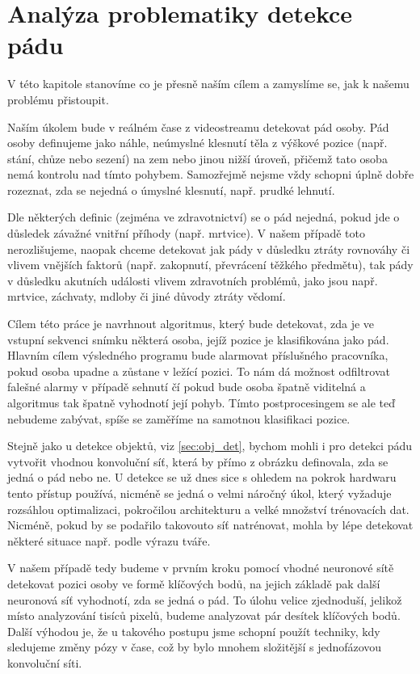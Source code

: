 \chapter{Analýza problematiky detekce pádu}
\label{sec:Goal}

V této kapitole stanovíme co je přesně naším cílem a zamyslíme se, jak k našemu
problému přistoupit.

Naším úkolem bude v reálném čase z videostreamu detekovat pád osoby. Pád osoby
definujeme jako náhle, neúmyslné klesnutí těla z výškové pozice (např. stání,
chůze nebo sezení) na zem nebo jinou nižší úroveň, přičemž tato osoba nemá
kontrolu nad tímto pohybem. Samozřejmě nejsme vždy schopni úplně dobře
rozeznat, zda se nejedná o úmyslné klesnutí, např. prudké lehnutí.

Dle některých definic (zejména ve zdravotnictví) se o pád nejedná, pokud jde o
důsledek závažné vnitřní příhody (např. mrtvice). V našem případě toto
nerozlišujeme, naopak chceme detekovat jak pády v důsledku ztráty rovnováhy či
vlivem vnějších faktorů (např. zakopnutí, převrácení těžkého předmětu), tak
pády v důsledku akutních události vlivem zdravotních problémů, jako jsou např.
mrtvice, záchvaty, mdloby či jiné důvody ztráty vědomí.

Cílem této práce je navrhnout algoritmus, který bude detekovat, zda je ve
vstupní sekvenci snímku některá osoba, jejíž pozice je klasifikována jako pád.
Hlavním cílem výsledného programu bude alarmovat příslušného pracovníka, pokud
osoba upadne a zůstane v ležící pozici. To nám dá možnost odfiltrovat falešné
alarmy v případě sehnutí čí pokud bude osoba špatně viditelná a algoritmus tak
špatně vyhodnotí její pohyb. Tímto postprocesingem se ale teď nebudeme zabývat,
spíše se zaměříme na samotnou klasifikaci pozice.

Stejně jako u detekce objektů, viz \ref{sec:obj_det}, bychom mohli i pro
detekci pádu vytvořit vhodnou konvoluční síť, která by přímo z obrázku
definovala, zda se jedná o pád nebo ne. U detekce se už dnes sice s ohledem na
pokrok hardwaru tento přístup používá, nicméně se jedná o velmi náročný úkol,
který vyžaduje rozsáhlou optimalizaci, pokročilou architekturu a velké množství
trénovacích dat. Nicméně, pokud by se podařilo takovouto síť natrénovat, mohla
by lépe detekovat některé situace např. podle výrazu tváře.

V našem případě tedy budeme v prvním kroku pomocí vhodné neuronové sítě
detekovat pozici osoby ve formě klíčových bodů, na jejich základě pak další
neuronová síť vyhodnotí, zda se jedná o pád. To úlohu velice zjednoduší,
jelikož místo analyzování tisíců pixelů, budeme analyzovat pár desítek
klíčových bodů. Další výhodou je, že u takového postupu jsme schopní použít
techniky, kdy sledujeme změny pózy v čase, což by bylo mnohem složitější s
jednofázovou konvoluční síti.

